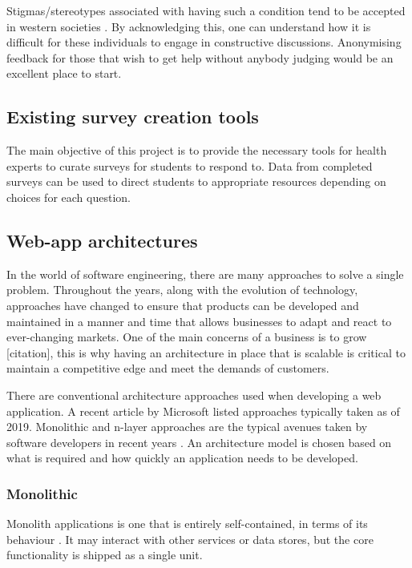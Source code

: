 Stigmas/stereotypes associated with having such a condition tend to be accepted in western societies \cite{corrigan2002paradox}.
By acknowledging this, one can understand how it is difficult for these individuals to engage in constructive discussions.
Anonymising feedback for those that wish to get help without anybody judging would be an excellent place to start. 

\subsection{Existing survey creation tools}
The main objective of this project is to provide the necessary tools for health experts to curate surveys for students to respond to.
Data from completed surveys can be used to direct students to appropriate resources depending on choices for each question.


\subsection{Web-app architectures}
In the world of software engineering, there are many approaches to solve a single problem.
Throughout the years, along with the evolution of technology, approaches have changed to ensure that products can be developed and maintained in a manner and time that allows businesses to adapt and react to ever-changing markets. 
One of the main concerns of a business is to grow [citation], this is why having an architecture in place that is scalable is
critical to maintain a competitive edge and meet the demands of customers.

There are conventional architecture approaches used when developing a web application.
A recent article by Microsoft listed approaches typically taken as of 2019. 
Monolithic and n-layer approaches are the typical avenues taken by software developers in recent years \cite{ardalis_common}.
An architecture model is chosen based on what is required and how quickly an application needs to be developed.

\subsubsection{Monolithic} \label{monolithic}
Monolith applications is one that is entirely self-contained, in terms of its behaviour \cite{ardalis_common}.
It may interact with other services or data stores, but the core functionality is shipped as a single unit.

